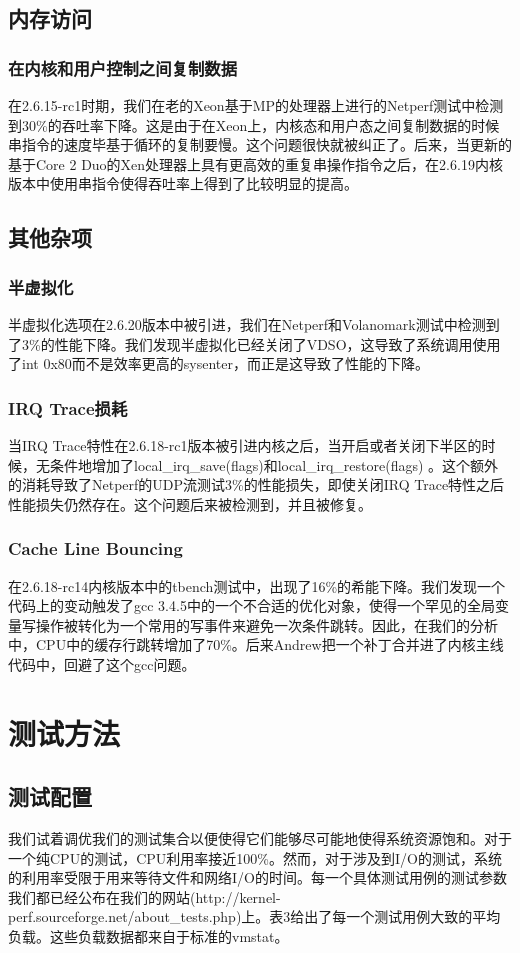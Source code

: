 \subsection{内存访问}
\subsubsection{在内核和用户控制之间复制数据}

在2.6.15-rc1时期，我们在老的Xeon基于MP的处理器上进行的Netperf测试中检测到30\%的吞吐率下降。这是由于在Xeon上，内核态和用户态之间复制数据的时候串指令的速度毕基于循环的复制要慢。这个问题很快就被纠正了。后来，当更新的基于Core 2 Duo的Xen处理器上具有更高效的重复串操作指令之后，在2.6.19内核版本中使用串指令使得吞吐率上得到了比较明显的提高。

\subsection{其他杂项}
\subsubsection{半虚拟化}
半虚拟化选项在2.6.20版本中被引进，我们在Netperf和Volanomark测试中检测到了3\%的性能下降。我们发现半虚拟化已经关闭了VDSO，这导致了系统调用使用了int 0x80而不是效率更高的sysenter，而正是这导致了性能的下降。
\subsubsection{IRQ  Trace损耗}
当IRQ Trace特性在2.6.18-rc1版本被引进内核之后，当开启或者关闭下半区的时候，无条件地增加了local\_irq\_save(flags)和local\_irq\_restore(flags) 。这个额外的消耗导致了Netperf的UDP流测试3\%的性能损失，即使关闭IRQ Trace特性之后性能损失仍然存在。这个问题后来被检测到，并且被修复。
\subsubsection{Cache Line Bouncing}
在2.6.18-rc14内核版本中的tbench测试中，出现了16\%的希能下降。我们发现一个代码上的变动触发了gcc 3.4.5中的一个不合适的优化对象，使得一个罕见的全局变量写操作被转化为一个常用的写事件来避免一次条件跳转。因此，在我们的分析中，CPU中的缓存行跳转增加了70\%。后来Andrew把一个补丁合并进了内核主线代码中，回避了这个gcc问题。


\section{测试方法}
\subsection{测试配置}
我们试着调优我们的测试集合以便使得它们能够尽可能地使得系统资源饱和。对于一个纯CPU的测试，CPU利用率接近100\%。然而，对于涉及到I/O的测试，系统的利用率受限于用来等待文件和网络I/O的时间。每一个具体测试用例的测试参数我们都已经公布在我们的网站(http://kernel-perf.sourceforge.net/about\_tests.php)上。表3给出了每一个测试用例大致的平均负载。这些负载数据都来自于标准的vmstat。

